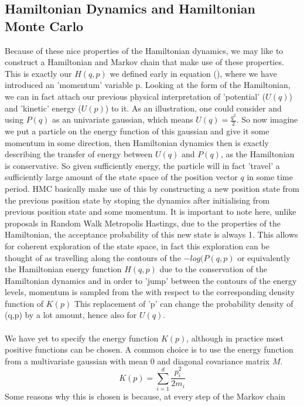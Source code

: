 \documentclass[11pt]{article}
\begin{document}
\subsection{Hamiltonian Dynamics and Hamiltonian Monte Carlo}
Because of these nice properties of the Hamiltonian dynamics, we may like to construct a Hamiltonian and Markov chain that make use of these properties. This is exactly our $H(q,p)$ we defined early in equation (), where we have introduced an 'momentum' variable p. Looking at the form of the Hamiltonian, we can in fact attach our previous physical interpretation of 'potential' ($U(q)$) and 'kinetic' energy ($U(p)$) to it. As an illustration, one could consider and using $P(q)$ as an univariate gaussian, which means $U(q)=\frac{q^2}{2}$. So now imagine we put a particle on the energy function of this gaussian and give it some momentum in some direction, then Hamiltonian dynamics then is exactly describing the transfer of energy between $U(q)$ and $P(q)$, as the Hamiltonian is conservative. So given sufficiently energy, the particle will in fact 'travel' a sufficiently large amount of the state space of the position vector $q$ in some time period. HMC basically make use of this by constructing a new  position state from the previous position state by stoping the dynamics after initialising from previous position state and some momentum. It is important to note here, unlike proposals in Random Walk Metropolis Hastings, due to the properties of the Hamiltonian, the acceptance probability of this new state is always 1. This allows for coherent exploration of the state space, in fact this exploration can be thought of as  travelling along the contours of the $-log( P(q,p)$ or equivalently the Hamiltonian energy function $H(q,p)$ due to the conservation of the Hamiltonian dynamics and in order to 'jump' between the contours of the energy levels, momentum is sampled from the with respect to the corresponding density function of $K(p)$ This replacement of 'p' can change the probability density of (q,p) by a lot amount, hence also for $U(q)$.
\\
\\
We have yet to specify the energy function $K(p)$, although in practice most positive functions can be chosen. A common choice is to use the energy function from a multivariate gaussian with mean 0 and diagonal covariance matrix $M$.
\begin{equation}
K(p) = \sum_{i=1}^{d} \frac{p_{i}^{2}}{2m_{i}}
\end{equation}
Some reasons why this is chosen is because, at every step of the Markov chain
\end{document}
